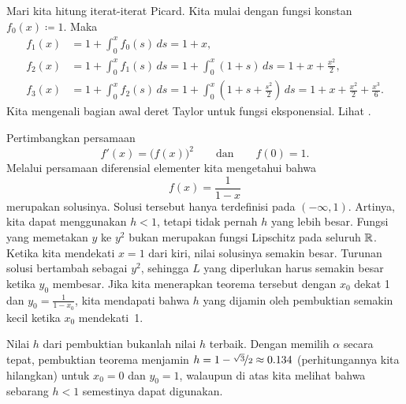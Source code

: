 \begin{example}
Mari kita hitung iterat-iterat Picard.
Kita mulai dengan fungsi konstan $f_0(x) \coloneqq 1$.  Maka
\begin{align*}
f_1(x) & = 1 + \int_0^x f_0(s)\,ds =
1+x, \\
f_2(x) & = 1 + \int_0^x f_1(s)\,ds =
1 + \int_0^x (1+s)\,ds = 1 + x + \frac{x^2}{2}, \\
f_3(x) & = 1 + \int_0^x f_2(s)\,ds =
1 + \int_0^x \left(1+ s + \frac{s^2}{2} \right)\,ds =
1 + x + \frac{x^2}{2} + \frac{x^3}{6} .
\end{align*}
Kita mengenali bagian awal deret Taylor untuk fungsi eksponensial.
Lihat .
\begin{myfigureht}
\caption{Fungsi eksponensial (garis penuh) bersama dengan $f_0$, $f_1$, $f_2$,
$f_3$ (putus-putus).\label{fig:exppicard}}
\end{myfigureht}
\end{example}

\begin{example}
Pertimbangkan persamaan
\begin{equation*}
f'(x) = {\bigl(f(x)\bigr)}^2 \qquad \text{dan} \qquad f(0)=1.
\end{equation*}
Melalui persamaan diferensial elementer kita mengetahui bahwa
\begin{equation*}
f(x) = \frac{1}{1-x}
\end{equation*}
merupakan solusinya.
Solusi tersebut hanya terdefinisi pada $(-\infty,1)$.  Artinya,
kita dapat menggunakan $h < 1$, tetapi tidak pernah $h$ yang lebih besar.
Fungsi yang memetakan $y$ ke $y^2$
bukan merupakan fungsi Lipschitz pada seluruh ${\mathbb{R}}$.
Ketika kita mendekati $x=1$ dari kiri, nilai solusinya semakin
besar.  Turunan solusi bertambah sebagai $y^2$, sehingga
$L$ yang diperlukan harus semakin besar ketika $y_0$ membesar.
Jika kita menerapkan
teorema tersebut dengan $x_0$ dekat 1 dan $y_0 = \frac{1}{1-x_0}$, kita mendapati
bahwa $h$ yang dijamin oleh pembuktian semakin kecil ketika $x_0$
mendekati~1.

Nilai $h$ dari pembuktian bukanlah nilai $h$ terbaik.
Dengan memilih $\alpha$ secara tepat, pembuktian teorema menjamin
$h=1-\nicefrac{\sqrt{3}}{2} \approx 0.134$ (perhitungannya kita
hilangkan) untuk $x_0=0$ dan $y_0=1$, walaupun
di atas kita melihat bahwa sebarang $h < 1$ semestinya dapat digunakan.
\end{example}

